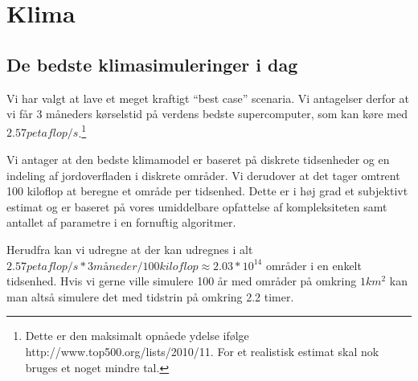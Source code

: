 \section{Klima}

\subsection{De bedste klimasimuleringer i dag}
Vi har valgt at lave et meget kraftigt ``best case'' scenaria. Vi antagelser
derfor at vi får 3 måneders kørselstid på verdens bedste supercomputer, som
kan køre med $2.57 petaflop/s$.\footnote{Dette er den maksimalt opnåede ydelse
ifølge http://www.top500.org/lists/2010/11. For et realistisk estimat skal nok
bruges et noget mindre tal.}

Vi antager at den bedste klimamodel er baseret på diskrete tidsenheder og en
indeling af jordoverfladen i diskrete områder. Vi derudover at
det tager omtrent 100 kiloflop at beregne et område per tidsenhed. Dette er i
høj grad et subjektivt estimat og er baseret på vores umiddelbare opfattelse af
kompleksiteten samt antallet af parametre i en fornuftig algoritmer.

Herudfra kan vi udregne at der kan udregnes i alt $2.57 petaflop/s * 3 måneder /
100 kiloflop \approx 2.03*10^14$ områder i en enkelt tidsenhed. Hvis vi gerne
ville simulere 100 år med områder på omkring $1 km^2$ kan man altså simulere det
med tidstrin på omkring 2.2 timer. 
